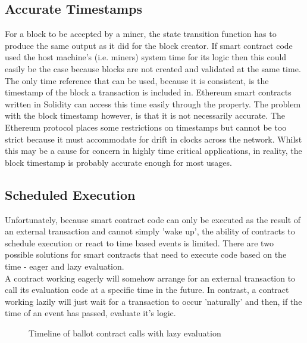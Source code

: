\subsection{Accurate Timestamps}
For a block to be accepted by a miner, the state transition function has to produce the same output as it did for the block creator. If smart contract code used the host machine's (i.e. miners) system time for its logic then this could easily  be the case because blocks are not created and validated at the same time. The only time reference that can be used, because it is consistent, is the timestamp of the block a transaction is included in. Ethereum smart contracts written in Solidity can access this time easily through the  property. The problem with the block timestamp however, is that it is not necessarily accurate. The Ethereum protocol places some restrictions on timestamps but cannot be too strict because it must accommodate for drift in clocks across the network. Whilst this may be a cause for concern in highly time critical applications, in reality, the block timestamp is probably accurate enough for most usages.\\

\subsection{Scheduled Execution}
Unfortunately, because smart contract code can only be executed as the result of an external transaction and cannot simply 'wake up', the ability of contracts to schedule execution or react to time based events is limited. There are two possible solutions for smart contracts that need to execute code based on the time - eager and lazy evaluation. \\

A contract working eagerly will somehow arrange for an external transaction to call its evaluation code at a specific time in the future. In contrast, a contract working lazily will just wait for a transaction to occur 'naturally' and then, if the time of an event has passed, evaluate it's logic.\\
\begin{figure}
\centering
{}
\decoRule
\caption[Lazy Contract Scheduling]{Timeline of ballot contract calls with lazy evaluation}
\label{fig:lazy}
\end{figure}

